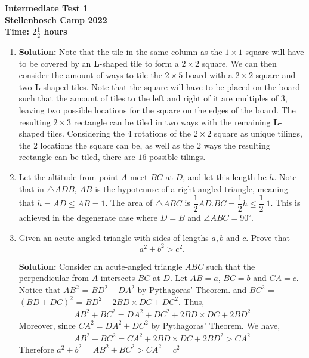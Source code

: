 \documentclass{article}
\begin{document}
\thispagestyle{empty}

\begin{center}
  \textbf{\Large Intermediate Test 1}
  \\ \vspace{1em}
  \textbf{\large Stellenbosch Camp 2022}
  \\ \vspace{1em}
  \textbf{\large Time: $2\frac{1}{2}$ hours}
\end{center}

\bigskip

\begin{enumerate}[itemsep=24pt]

\item %
\textbf{Solution:} Note that the tile in the same column as the $1\times1$ square will have to be covered by an $\mathbf{L}$-shaped tile to form a $2\times2$ square. We can then consider the amount of ways to tile the $2\times5$ board with a $2\times2$ square and two $\mathbf{L}$-shaped tiles. Note that the square will have to be placed on the board such that the amount of tiles to the left and right of it are multiples of $3$, leaving two possible locations for the square on the edges of the board. The resulting $2\times3$ rectangle can be tiled in two ways with the remaining $\mathbf{L}$-shaped tiles. Considering the $4$ rotations of the $2\times2$ square as unique tilings, the $2$ locations the square can be, as well as the $2$ ways the resulting rectangle can be tiled, there are $16$ possible tilings. 


\item %
Let the altitude from point $A$ meet $BC$ at $D$, and let this length be $h$. Note that in $\triangle ADB$, $AB$ is the hypotenuse of a right angled triangle, meaning that $h = AD \leq AB = 1$. The area of $\triangle ABC$ is $\dfrac{1}{2}AD.BC = \dfrac{1}{2}h \leq \dfrac{1}{2}.1$. This is achieved in the degenerate case where $D = B$ and $\angle ABC = 90^{\circ}$.


\item %
Given an acute angled triangle with sides of lengths $a,b$ and $c$. Prove that \[a^2 + b^2 > c^2.\]

\textbf{Solution:} Consider an acute-angled triangle $ABC$ such that the perpendicular from $A$ intersects $BC$ at $D$. Let $AB=a$, $BC=b$ and $CA=c$. Notice that $AB^{2}$ = $BD^{2} + DA^{2}$ by Pythagoras' Theorem.  and $BC^{2}$ = $(BD + DC)^{2}$ = $BD^{2} + 2BD\times DC + DC^{2}$. Thus,
\begin{align*}
    AB^{2} + BC^{2} = DA^{2} + DC^{2} + 2BD \times DC + 2BD^{2}
\end{align*}
Moreover, since $CA^{2} = DA^{2} + DC^{2}$ by Pythagoras' Theorem. We have,
\begin{align*}
    AB^{2} + BC^{2} = CA^{2} + 2BD \times DC + 2BD^{2} > CA^{2}  
\end{align*}
Therefore $a^{2} + b^{2} = AB^{2} + BC^{2} > CA^{2} = c^{2}$



\end{enumerate}
\end{document}

